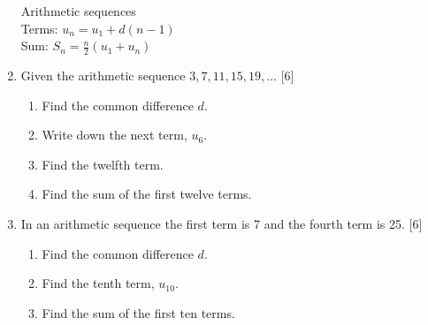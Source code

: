 \documentclass[12pt, twoside]{article}
\begin{document}
\begin{enumerate}
\begin{center}
  \end{center}

\newpage
Arithmetic sequences\\[0.25cm]
Terms: $u_n=u_1 + d(n-1)$\\[0.25cm]
Sum: $\displaystyle S_n= \frac{n}{2}(u_1 + u_n)$\\[0.25cm]


\item Given the arithmetic sequence $3,7,11,15,19, \dots$ \hfill [6]
  \begin{enumerate}[itemsep=1cm]
    \item Find the common difference $d$.
    \item Write down the next term, $u_6$.
    \item Find the twelfth term.\vspace{1cm}
    \item Find the sum of the first twelve terms.
  \end{enumerate} \vspace{2cm}

\item In an arithmetic sequence the first term is 7 and the fourth term is 25. \hfill [6]
  \begin{enumerate}[itemsep=2cm]
    \item Find the common difference $d$.
    \item Find the tenth term, $u_{10}$.\vspace{1cm}
    \item Find the sum of the first ten terms.
  \end{enumerate} \vspace{3cm}


\end{enumerate}
\end{document}

